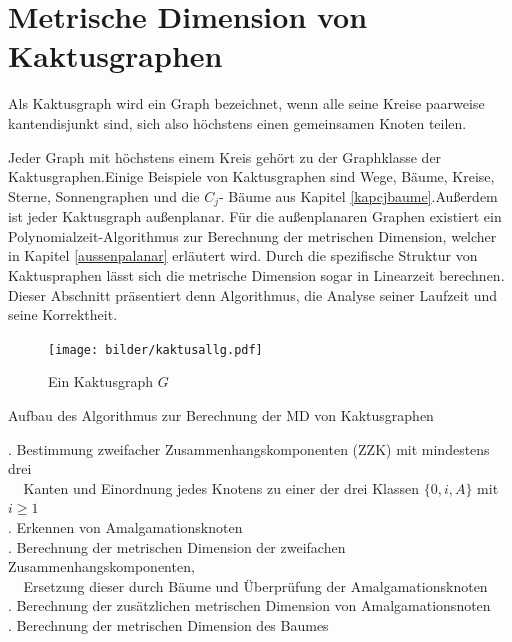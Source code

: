 \chapter{Metrische Dimension von Kaktusgraphen}
\label{kapkaktus}
\begin{defi}
Als Kaktusgraph wird ein Graph bezeichnet, wenn alle seine Kreise paarweise kantendisjunkt sind, sich also höchstens einen gemeinsamen Knoten teilen.
\end{defi}
Jeder Graph mit höchstens einem Kreis gehört zu der Graphklasse der Kaktusgraphen.\newline Einige Beispiele von Kaktusgraphen sind Wege, Bäume, Kreise, Sterne, Sonnengraphen und die $C_j$- Bäume aus Kapitel \ref{kapcjbaume}.\newline Außerdem ist jeder Kaktusgraph außenplanar. Für die außenplanaren Graphen existiert ein Polynomialzeit-Algorithmus zur Berechnung der metrischen Dimension, welcher in Kapitel \ref{aussenpalanar} erläutert wird. Durch die spezifische Struktur von Kaktuspraphen lässt sich die metrische Dimension sogar in Linearzeit berechnen. Dieser Abschnitt präsentiert denn Algorithmus, die Analyse seiner Laufzeit und seine Korrektheit.
\begin{figure}[h!]
		\centering
 		 \texttt{[image: bilder/kaktusallg.pdf]}
   \caption{Ein Kaktusgraph $G$}
   \label{gk}
  	 \end{figure}
  	 \vspace{-2mm}
\begin{algorithm}
\caption{Aufbau des Algorithmus zur Berechnung der MD von Kaktusgraphen}
\begin{algorithmic}
\vspace{2mm}
\vspace{2mm}
\vspace{2mm}
. Bestimmung zweifacher Zusammenhangskomponenten (ZZK) mit mindestens drei\\$\;\;\;\;$Kanten und Einordnung jedes Knotens zu einer der drei Klassen $\{0,i,A\}$ mit $i \geq 1$\\
\vspace{2mm}
. Erkennen von Amalgamationsknoten\\
\vspace{2mm}
. Berechnung der metrischen Dimension der zweifachen Zusammenhangskomponenten,\\$\;\;\;\;$Ersetzung dieser durch Bäume und Überprüfung der Amalgamationsknoten\\
\vspace{2mm}
. Berechnung der zusätzlichen metrischen Dimension von Amalgamationsnoten\\
\vspace{2mm}
. Berechnung der metrischen Dimension des Baumes
\vspace{2mm}
\end{algorithmic}
\end{algorithm}
\newpage
